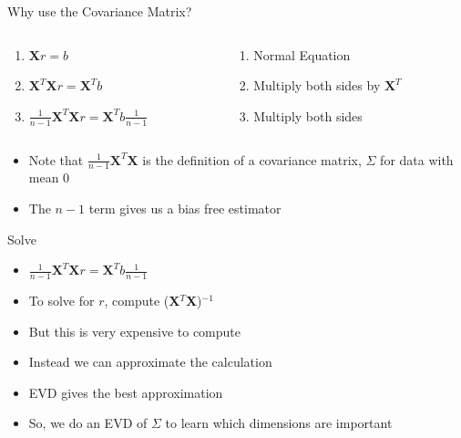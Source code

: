 \documentclass[aspectratio=169]{beamer}
\begin{document}
\begin{frame}{Why use the Covariance Matrix?}

\begin{columns}
\begin{column}{0.5\textwidth}
\begin{enumerate}
\item $\textbf{X}r = b$
\item $\textbf{X}^T\textbf{X}r = \textbf{X}^Tb$
\item $\frac{1}{n-1}\textbf{X}^T\textbf{X}r = \textbf{X}^Tb\frac{1}{n-1}$
\end{enumerate}
\end{column}
\begin{column}{0.5\textwidth}
\begin{enumerate}
\item Normal Equation
\item Multiply both sides by $\textbf{X}^T$
\item Multiply both sides 
\end{enumerate}
\end{column}
\end{columns}
\begin{itemize}
\vspace{1em}
\item Note that $\frac{1}{n-1}\textbf{X}^T\textbf{X}$ is the definition of a covariance matrix, \textbf{$\Sigma$} for data with mean 0
\item The $n-1$ term gives us a bias free estimator %
\end{itemize}
\end{frame}
\begin{frame}{Solve}


\begin{itemize}
\item[]  $\frac{1}{n-1}\textbf{X}^T\textbf{X}r = \textbf{X}^Tb\frac{1}{n-1}$
\item To solve for $r$, compute (\textbf{X}$^T$\textbf{X})$^{-1}$ %
 \item But this is very expensive to compute
 \item Instead we can approximate the calculation
 \item EVD gives the best approximation
 \item So, we do an EVD of $\Sigma$ to learn which dimensions are important
\end{itemize}
\end{frame}
\end{document}
